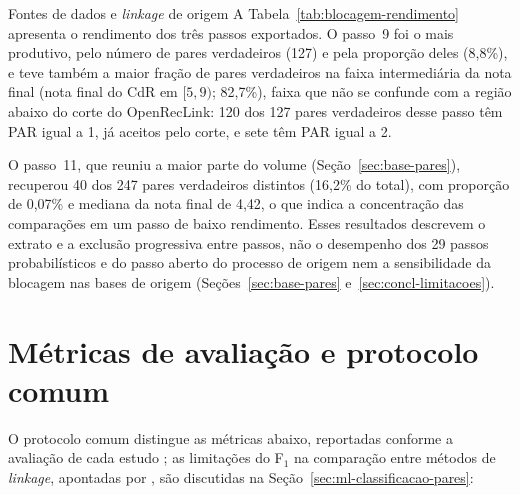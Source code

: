 \begin{chapter}{Fontes de dados e \textit{linkage} de origem}
A Tabela~\ref{tab:blocagem-rendimento} apresenta o rendimento dos três passos exportados. O passo~9 foi o mais produtivo, pelo número de pares verdadeiros (127) e pela proporção deles (8,8\%), e teve também a maior fração de pares verdadeiros na faixa intermediária da nota final (nota final do CdR em $[5,9)$; 82,7\%), faixa que não se confunde com a região abaixo do corte do OpenRecLink: 120 dos 127 pares verdadeiros desse passo têm PAR igual a 1, já aceitos pelo corte, e sete têm PAR igual a 2.



O passo~11, que reuniu a maior parte do volume (Seção~\ref{sec:base-pares}), recuperou 40 dos 247 pares verdadeiros distintos (16,2\% do total), com proporção de 0,07\% e mediana da nota final de 4,42, o que indica a concentração das comparações em um passo de baixo rendimento. Esses resultados descrevem o extrato e a exclusão progressiva entre passos, não o desempenho dos 29 passos probabilísticos e do passo aberto do processo de origem nem a sensibilidade da blocagem nas bases de origem (Seções~\ref{sec:base-pares} e~\ref{sec:concl-limitacoes}).

\section{Métricas de avaliação e protocolo comum}\label{sec:metricas}

O protocolo comum distingue as métricas abaixo, reportadas conforme a avaliação de cada estudo \cite{Hastie2009elements}; as limitações do F$_1$ na comparação entre métodos de \textit{linkage}, apontadas por , são discutidas na Seção~\ref{sec:ml-classificacao-pares}:


\end{chapter}

